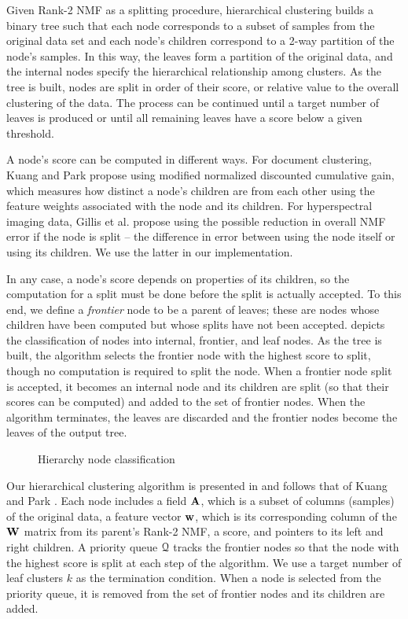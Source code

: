 \documentclass[conference,compsoc]{IEEEtran}
\begin{document}
Given Rank-2 NMF as a splitting procedure, hierarchical clustering builds a binary tree such that each node corresponds to a subset of samples from the original data set and each node's children correspond to a 2-way partition of the node's samples.
In this way, the leaves form a partition of the original data, and the internal nodes specify the hierarchical relationship among clusters.
As the tree is built, nodes are split in order of their score, or relative value to the overall clustering of the data.
The process can be continued until a target number of leaves is produced or until all remaining leaves have a score below a given threshold.

A node's score can be computed in different ways.
For document clustering, Kuang and Park \cite{KP13} propose using modified normalized discounted cumulative gain, which measures how distinct a node's children are from each other using the feature weights associated with the node and its children.
For hyperspectral imaging data, Gillis et al. \cite{GKP15} propose using the possible reduction in overall NMF error if the node is split -- the difference in error between using the node itself or using its children.
We use the latter in our implementation.

In any case, a node's score depends on properties of its children, so the computation for a split must be done before the split is actually accepted.
To this end, we define a \emph{frontier} node to be a parent of leaves; these are nodes whose children have been computed but whose splits have not been accepted.
 depicts the classification of nodes into internal, frontier, and leaf nodes.
As the tree is built, the algorithm selects the frontier node with the highest score to split, though no computation is required to split the node.
When a frontier node split is accepted, it becomes an internal node and its children are split (so that their scores can be computed) and added to the set of frontier nodes.
When the algorithm terminates, the leaves are discarded and the frontier nodes become the leaves of the output tree.

\begin{figure}

\caption{Hierarchy node classification}
\label{fig:tree}
\end{figure}

Our hierarchical clustering algorithm is presented in  and follows that of Kuang and Park \cite{KP13}.
Each node includes a field $\M{A}$, which is a subset of columns (samples) of the original data, a feature vector $\V{w}$, which is its corresponding column of the $\M{W}$ matrix from its parent's Rank-2 NMF, a score, and pointers to its left and right children.
A priority queue $\cal Q$ tracks the frontier nodes so that the node with the highest score is split at each step of the algorithm.
We use a target number of leaf clusters $k$ as the termination condition.
When a node is selected from the priority queue, it is removed from the set of frontier nodes and its children are added.
\end{document}
